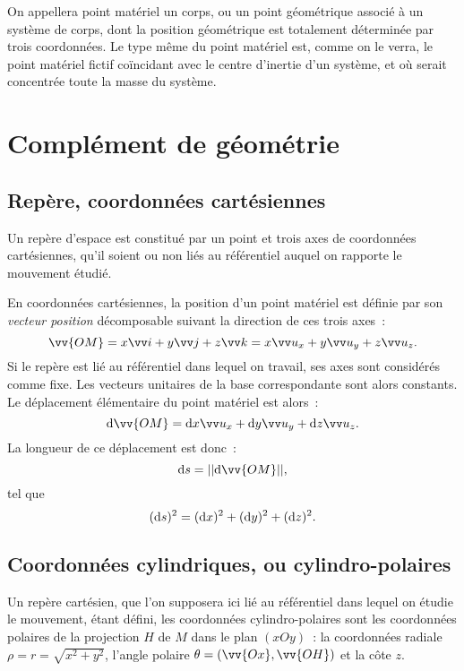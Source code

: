 On appellera point matériel un corps, ou un point géométrique associé à un système de corps, dont la position géométrique est totalement déterminée par trois coordonnées. Le type même du point matériel est, comme on le verra, le point matériel fictif coïncidant avec le centre d'inertie d'un système, et où serait concentrée toute la masse du système.

\section{Complément de géométrie}
\label{chap1-sec:complementdegeometrie}

\subsection{Repère, coordonnées cartésiennes}
\label{chap1-subsec:reperecoord}

Un repère d'espace est constitué par un point et trois axes de coordonnées cartésiennes, qu'il soient ou non liés au référentiel auquel on rapporte le mouvement étudié.

En coordonnées cartésiennes, la position d'un point matériel est définie par son \emph{vecteur position} décomposable suivant la direction de ces trois axes~:
\begin{equation}
  \vv{OM}=x\vi+y\vj+z\vk=x\ux+y\uy+z\uz.
\end{equation}
Si le repère est lié au référentiel dans lequel on travail, ses axes sont considérés comme fixe. Les vecteurs unitaires de la base correspondante sont alors constants. Le déplacement élémentaire du point matériel est alors~:
\begin{equation}
  \D\vv{OM}=\D x\ux+\D y\uy+\D z\uz.
\end{equation}
La longueur de ce déplacement est donc~:
\begin{equation}
  \D s = ||\D\vv{OM}||,
\end{equation}
tel que
\begin{equation}
  (\mathrm{d} s)^2=(\mathrm{d} x)^2+(\mathrm{d} y)^2+(\mathrm{d} z)^2.
\end{equation}

\subsection{Coordonnées cylindriques, ou cylindro-polaires}
\label{chap1-subsec:coordcylindriques}

Un repère cartésien, que l'on supposera ici lié au référentiel dans lequel on étudie le mouvement, étant défini, les coordonnées cylindro-polaires sont les coordonnées polaires de la projection \(H\) de \(M\) dans le plan \((xOy)\)~: la coordonnées radiale \(\rho=r=\sqrt{x^2+y^2}\), l'angle polaire \(\theta=(\vv{Ox}, \vv{OH})\) et la côte \(z\).

